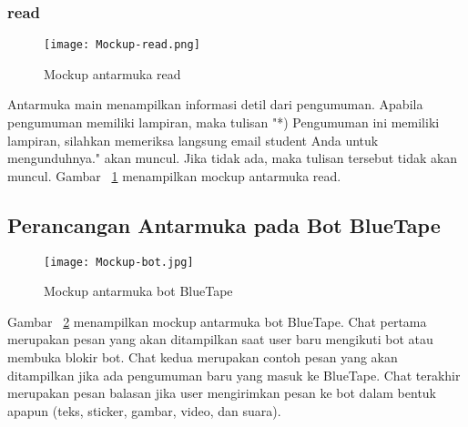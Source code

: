 \subsubsection{read}

\begin{figure}[H]
	\centering  
	\texttt{[image: Mockup-read.png]}  
	\caption[Mockup antarmuka read]{Mockup antarmuka read} 
	\label{fig:mockup-read} 
\end{figure}

Antarmuka main menampilkan informasi detil dari pengumuman. Apabila pengumuman memiliki lampiran, maka tulisan "*) Pengumuman ini memiliki lampiran, silahkan memeriksa langsung email student Anda untuk mengunduhnya." akan muncul. Jika tidak ada, maka tulisan tersebut tidak akan muncul. Gambar~ \ref{fig:mockup-read} menampilkan mockup antarmuka read.

\subsection{Perancangan Antarmuka pada Bot BlueTape}

\begin{figure}[H]
	\centering  
	\texttt{[image: Mockup-bot.jpg]}  
	\caption[Mockup antarmuka bot BlueTape]{Mockup antarmuka bot BlueTape} 
	\label{fig:mockup-bot} 
\end{figure}

Gambar~ \ref{fig:mockup-bot} menampilkan mockup antarmuka bot BlueTape. Chat pertama merupakan pesan yang akan ditampilkan saat user baru mengikuti bot atau membuka blokir bot. Chat kedua merupakan contoh pesan yang akan ditampilkan jika ada pengumuman baru yang masuk ke BlueTape. Chat terakhir merupakan pesan balasan jika user mengirimkan pesan ke bot dalam bentuk apapun (teks, sticker, gambar, video, dan suara).